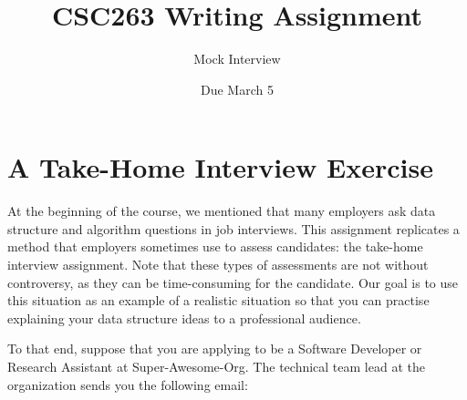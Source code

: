\documentclass{article}
\title{\vspace{-3.5cm}CSC263 Writing Assignment}
\author{Mock Interview}
\date{\small Due March 5}
\begin{document}
\maketitle


	\vspace{-1cm}
\section*{A Take-Home Interview Exercise}
\small At the beginning of the course, we mentioned that many employers ask data structure and algorithm questions in job
interviews. This assignment replicates a method that employers sometimes use to assess candidates: the take-home
interview assignment. Note that these types of assessments are not without controversy, as they can be time-consuming for
the candidate. Our goal is to use this situation as an example of a realistic situation so that you can practise explaining your
data structure ideas to a professional audience.

To that end, suppose that you are applying to be a Software Developer or Research Assistant at Super-Awesome-Org. The
technical team lead at the organization sends you the following email:
\vspace{1cm}
\end{document}
